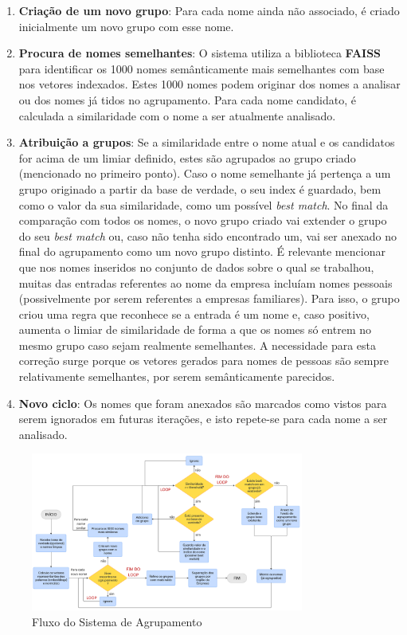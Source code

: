 \documentclass[a4paper,12pt]{article}
\begin{document}
\begin{enumerate}
    \item \textbf{Criação de um novo grupo}: Para cada nome ainda não associado, é criado inicialmente um novo grupo com esse nome.

    \item \textbf{Procura de nomes semelhantes}: O sistema utiliza a biblioteca \textbf{FAISS} para identificar os 1000 nomes semânticamente mais semelhantes com base nos vetores indexados. Estes 1000 nomes podem originar dos nomes a analisar ou dos nomes já tidos no agrupamento. Para cada nome candidato, é calculada a similaridade com o nome a ser atualmente analisado.

    \item \textbf{Atribuição a grupos}: Se a similaridade entre o nome atual e os candidatos for acima de um limiar definido, estes são agrupados ao grupo criado (mencionado no primeiro ponto). Caso o nome semelhante já pertença a um grupo originado a partir da base de verdade, o seu index é guardado, bem como o valor da sua similaridade, como um possível \textit{best match}. No final da comparação com todos os nomes, o novo grupo criado vai extender o grupo do seu \textit{best match} ou, caso não tenha sido encontrado um, vai ser anexado no final do agrupamento como um novo grupo distinto. É relevante mencionar que nos nomes inseridos no conjunto de dados sobre o qual se trabalhou, muitas das entradas referentes ao nome da empresa incluíam nomes pessoais (possivelmente por serem referentes a empresas familiares). Para isso, o grupo criou uma regra que reconhece se a entrada é um nome e, caso positivo, aumenta o limiar de similaridade de forma a que os nomes só entrem no mesmo grupo caso sejam realmente semelhantes. A necessidade para esta correção surge porque os vetores gerados para nomes de pessoas são sempre relativamente semelhantes, por serem semânticamente parecidos.

    \item \textbf{Novo ciclo}: Os nomes que foram anexados são marcados como vistos para serem ignorados em futuras iterações, e isto repete-se para cada nome a ser analisado.
\end{enumerate}

\begin{figure}[H]
    \centering
    \includegraphics[width=0.8\textwidth]{images/ClusteringFluxogram.png}
    \caption{Fluxo do Sistema de Agrupamento}
    \label{fig:design}
\end{figure}
\end{document}
